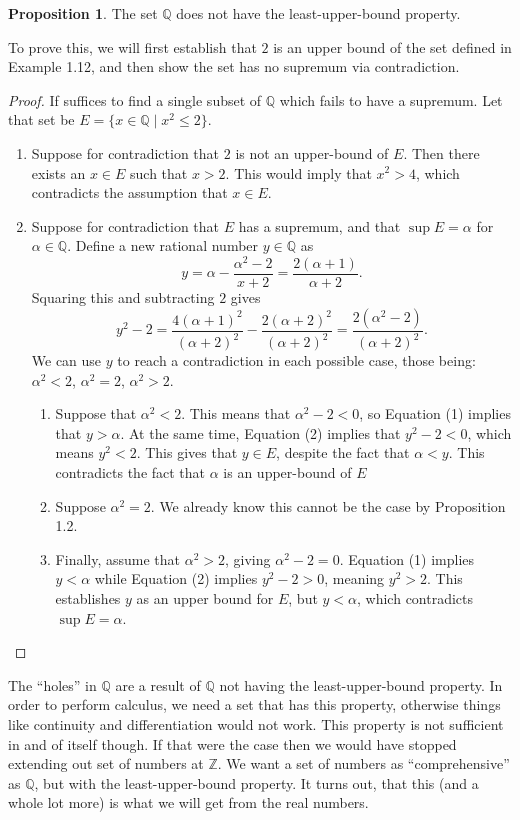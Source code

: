 \documentclass{article}
\newcommand{\Q}{\mathbb{Q}}
\newcommand{\Z}{\mathbb{Z}}
\theoremstyle{definition}
\newtheorem{proposition}{Proposition}[section]
\begin{document}
	\begin{proposition}
		The set $ \Q $ does not have the least-upper-bound property.
	\end{proposition}
	To prove this, we will first establish that $ 2 $ is an upper bound of the set defined in Example 1.12, and then show the set has no supremum via contradiction.
	\begin{proof}
		If suffices to find a single subset of $ \Q $ which fails to have a supremum. Let that set be $ E=\{x\in\Q\mid x^2\le 2\} $. 
		\begin{enumerate}
			\item Suppose for contradiction that $ 2 $ is not an upper-bound of $ E $. Then there exists an $ x\in E $ such that $ x>2 $. This would imply that $ x^2>4 $, which contradicts the assumption that $ x \in E $. 
			\item Suppose for contradiction that $ E $ has a supremum, and that $ \sup E=\alpha $ for $ \alpha\in\Q $. Define a new rational number $ y\in \Q $ as 
			\begin{equation}
				y=\alpha-\frac{\alpha^2-2}{x+2}=\frac{2(\alpha+1)}{\alpha+2}.
			\end{equation}
			Squaring this and subtracting $ 2 $ gives 
			\begin{equation}
				y^2-2=\frac{4(\alpha+1)^2}{(\alpha+2)^2}-\frac{2(\alpha+2)^2}{(\alpha+2)^2}=\frac{2(\alpha^2-2)}{(\alpha+2)^2}.
			\end{equation} We can use $ y $ to reach a contradiction in each possible case, those being: $ \alpha^2<2 $, $ \alpha^2=2 $, $ \alpha^2>2 $.
			\begin{enumerate}
				\item Suppose that $ \alpha^2<2 $. This means that $ \alpha^2-2<0 $, so Equation (1) implies that $ y>\alpha $. At the same time, Equation (2) implies that $ y^2-2<0 $, which means $ y^2<2 $. This gives that $ y\in E $, despite the fact that $ \alpha<y $. This contradicts the fact that $ \alpha $ is an upper-bound of $ E $
				\item Suppose $ \alpha^2=2 $. We already know this cannot be the case by Proposition 1.2. 
				\item  Finally, assume that $ \alpha^2>2 $, giving $ \alpha^2-2=0 $. Equation (1)	implies $ y<\alpha $ while Equation (2) implies $ y^2-2>0 $, meaning $ y^2>2 $. This establishes $ y $ as an upper bound for $ E $, but $ y<\alpha $, which contradicts $ \sup E=\alpha $.  
			\end{enumerate}
		\end{enumerate}
	\end{proof}
	The ``holes'' in $ \Q $ are a result of $ \Q $ not having the least-upper-bound property. In order to perform calculus, we need a set that has this property, otherwise things like continuity and differentiation would not work. This property is not sufficient in and of itself though. If that were the case then we would have stopped extending out set of numbers at $ \Z $. We want a set of numbers as ``comprehensive'' as $ \Q $, but with the least-upper-bound property. It turns out, that this (and a whole lot more) is what we will get from the real numbers.  
\end{document}
